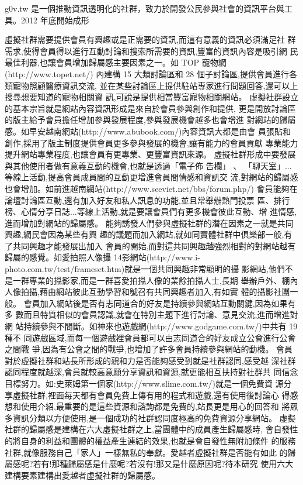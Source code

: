 g0v.tw 是一個推動資訊透明化的社群，致力於開發公民參與社會的資訊平台與工具。2012 年底開始成形


虛擬社群需要提供會員有興趣或是正需要的資訊,而這有意義的資訊必須滿足社
群需求,使得會員得以進行互動討論和搜索所需要的資訊,豐富的資訊內容是吸引網
民最佳利器,也讓會員增加歸屬感主要因素之一。如 TOP 寵物網(http://www.topet.net/)
內建構 15 大類討論區和 28 個子討論區,提供會員進行各類寵物照顧醫療資訊交流,
並在某些討論區上提供駐站專家進行問題回答,還可以上搜尋想要知道的寵物相關資
訊,可說是提供相當豐富寵物相關網站。
虛擬社群設立的基本宗旨就是網站內容資訊形成是來自於會員參與創作和提供,
更是開放討論區的版主給予會員擔任增加參與發展程度,參與發展機會越多也會增進
對網站的歸屬感。如早安越南網站(http://www.abubook.com/)內容資訊大都是由會
員張貼和創作,採用了版主制度提供會員更多參與發展的機會,讓有能力的會員貢獻
專業能力提升網站專業程度,也讓會員有更專業、更豐富資訊來源。
虛擬社群形成中要發展與其他使用者做有意義互動的機會,也就是透過「電子佈
告欄」
、
「聊天室」...等線上活動,提高會員成員間的互動更增進會員間情感和資訊交
流,對網站的歸屬感也會增加。如前進越南網站(http://www.seeviet.net/bbs/forum.php/)
會員能夠在論壇討論區互動,還有加入好友和私人訊息的功能,並且常舉辦熱門投票
區、排行榜、心情分享日誌...等線上活動,就是要讓會員們有更多機會彼此互動、增
進情感,進而增加對網站的歸屬感。
能夠誘發人們參與虛擬社群的潛在因素之一就是共同興趣,網民會因為某些有興
趣的議題而加入網站,就如同實體社群中俱樂部一般,有了共同興趣才能發展出加入
會員的開始,而對這共同興趣越強烈相對的對網站越有歸屬的感覺。如愛拍照人像攝
14影網站(http://www.i-photo.com.tw/test/frameset.htm)就是一個共同興趣非常顯明的攝
影網站,他們不是一群專業的攝影家,而是一群喜愛拍攝人像的業餘拍攝人士,長期
舉辦戶外、棚內人像拍攝,藉由網站彼此互動學習和號召有共同興趣者加入,有如實
體的攝影社團一般。
會員加入網站後是否有志同道合的好友是持續參與網站互動關鍵,因為如果有多
數而且特質相似的會員認識,就會在特別主題下進行討論、意見交流,進而增進對網
站持續參與不間斷。如神來也遊戲網(http://www.godgame.com.tw/)中共有 19 種不
同遊戲區域,而每一個遊戲裡會員都可以由志同道合的好友成立公會進行公會之間戰
爭,因為有公會之間的戰爭,也增加了許多會員持續參與網站的動機。
會員對於虛擬社群和站長所形成的親和力是否能夠感受到就是社群認同,感受越
深社群認同程度就越深,會員就較高意願分享資訊和資源,就更能相互扶持對社群共
同信念目標努力。如:史萊姆第一個家(http://www.slime.com.tw/)就是一個免費資
源分享虛擬社群,裡面每天都有會員免費上傳有用的程式和遊戲,還有使用後討論心
得感想和使用介紹,最重要的是這些資源和諮詢都是免費的,站長更是用心的回答和
將眾多資訊分類以方便使用,是一個成功的社群認同度極高的免費資源分享網站。
虛擬社群的歸屬感是建構在六大虛擬社群之上,當團體中的成員產生歸屬感時,
會自發性的將自身的利益和團體的權益產生連結的效果,也就是會自發性無附加條件
的服務社群,就像服務自己「家人」一樣無私的奉獻。愛越者虛擬社群是否能有如此
的歸屬感呢?若有!那種歸屬感是什麼呢?若沒有!那又是什麼原因呢?待本研究
使用六大建構要素建構出愛越者虛擬社群的歸屬感。




\EndChapter


